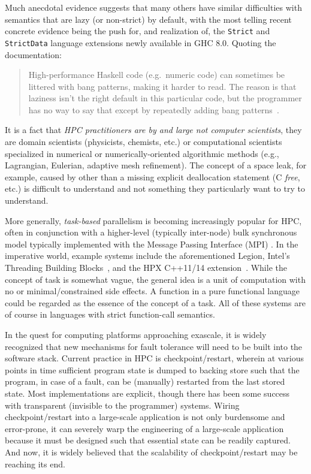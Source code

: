 \documentclass{llncs}
\begin{document}
Much anecdotal evidence suggests that many others have similar difficulties
with semantics that are lazy (or non-strict) by default, with the most telling
recent concrete evidence being the push for, and realization of, the
\texttt{Strict} and \texttt{StrictData} language extensions newly available in
GHC 8.0.  Quoting the documentation:
\begin{quote}
  High-performance Haskell code (e.g.\ numeric code) can sometimes be littered
  with bang patterns, making it harder to read. The reason is that laziness
  isn't the right default in this particular code, but the programmer has no
  way to say that except by repeatedly adding bang
  patterns~\cite{strict-strictdata}.
\end{quote}
It is a fact that \emph{HPC practitioners are by and large not computer
  scientists}, they are domain scientists (physicists, chemists, etc.) or
computational scientists specialized in numerical or numerically-oriented
algorithmic methods (e.g., Lagrangian, Eulerian, adaptive mesh refinement).
The concept of a space leak, for example, caused by other than a missing
explicit deallocation statement (C \emph{free}, etc.) is difficult to
understand and not something they particularly want to try to understand.

More generally, \emph{task-based} parallelism is becoming increasingly popular
for HPC, often in conjunction with a higher-level (typically inter-node) bulk
synchronous model typically implemented with the Message Passing Interface
(MPI) \cite{MPI}.  In the imperative world, example systems include the
aforementioned Legion, Intel's Threading Building Blocks~\cite{Reinders:2007},
and the HPX C++11/14 extension~\cite{HPX}.  While the concept of task is
somewhat vague, the general idea is a unit of computation with no or
minimal/constrained side effects.  A function in a pure functional language
could be regarded as the essence of the concept of a task.  All of these
systems are of course in languages with strict function-call semantics.

In the quest for computing platforms approaching exascale, it is widely
recognized that new mechanisms for fault tolerance will need to be built into
the software stack.  Current practice in HPC is checkpoint/restart, wherein at
various points in time sufficient program state is dumped to backing store such
that the program, in case of a fault, can be (manually) restarted from the
last stored state.  Most implementations are explicit, though there has been
some success with transparent (invisible to the programmer) systems.  Wiring
checkpoint/restart into a large-scale application is not only burdensome and
error-prone, it can severely warp the engineering of a large-scale application
because it must be designed such that essential state can be readily captured.
And now, it is widely believed that the scalability of checkpoint/restart may
be reaching its end.
\end{document}

